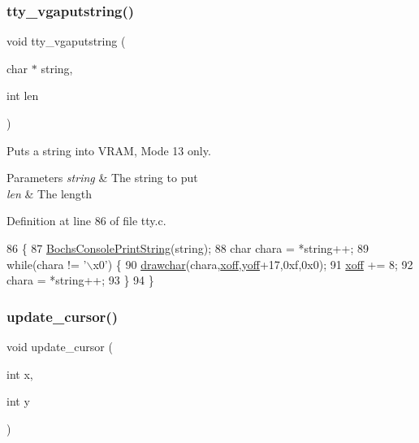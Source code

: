 \subsubsection{\texorpdfstring{tty\+\_\+vgaputstring()}{tty\_vgaputstring()}}
{\footnotesize\ttfamily void tty\+\_\+vgaputstring (\begin{DoxyParamCaption}\item[{char $\ast$}]{string,  }\item[{int}]{len }\end{DoxyParamCaption})}



Puts a string into V\+R\+AM, Mode 13 only. 


\begin{DoxyParams}{Parameters}
{\em string} & The string to put \\
\hline
{\em len} & The length \\
\hline
\end{DoxyParams}


Definition at line 86 of file tty.\+c.


\begin{DoxyCode}
86                                              \{
87     \hyperlink{a00071_a19e1f554d03c977f8b947f21489daa41_a19e1f554d03c977f8b947f21489daa41}{BochsConsolePrintString}(\textcolor{keywordtype}{string});
88     \textcolor{keywordtype}{char} chara = *\textcolor{keywordtype}{string}++;
89     \textcolor{keywordflow}{while}(chara != \textcolor{stringliteral}{'\(\backslash\)x0'}) \{
90         \hyperlink{a00056_a2c8df7a20b47341b70d97a7ff21d86ea_a2c8df7a20b47341b70d97a7ff21d86ea}{drawchar}(chara,\hyperlink{a00167_abaa0d20f0e52ce0d3a7d706f6ac16266_abaa0d20f0e52ce0d3a7d706f6ac16266}{xoff},\hyperlink{a00167_a1a7539764d0ae8cd06ce45c62cf92bca_a1a7539764d0ae8cd06ce45c62cf92bca}{yoff}+17,0xf,0x0);
91         \hyperlink{a00167_abaa0d20f0e52ce0d3a7d706f6ac16266_abaa0d20f0e52ce0d3a7d706f6ac16266}{xoff} += 8;
92         chara = *\textcolor{keywordtype}{string}++;
93     \}
94 \}
\end{DoxyCode}
\mbox{\label{a00167_a492f5021d7340613e732ef37bbaa04e4_a492f5021d7340613e732ef37bbaa04e4}} 
\subsubsection{\texorpdfstring{update\+\_\+cursor()}{update\_cursor()}}
{\footnotesize\ttfamily void update\+\_\+cursor (\begin{DoxyParamCaption}\item[{int}]{x,  }\item[{int}]{y }\end{DoxyParamCaption})}



